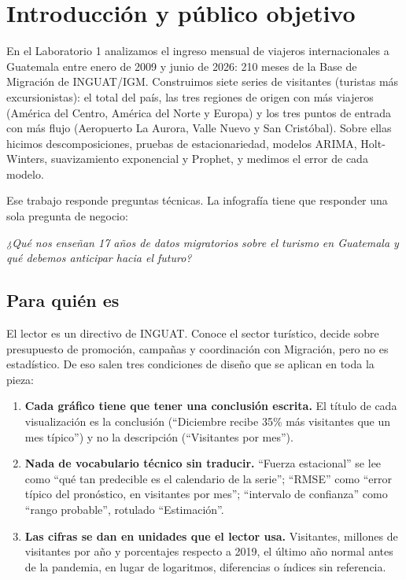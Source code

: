\section{Introducción y público objetivo}

En el Laboratorio 1 analizamos el ingreso mensual de viajeros internacionales a
Guatemala entre enero de 2009 y junio de 2026: 210 meses de la Base de Migración
de INGUAT/IGM. Construimos siete series de visitantes (turistas más
excursionistas): el total del país, las tres regiones de origen con más viajeros
(América del Centro, América del Norte y Europa) y los tres puntos de entrada con
más flujo (Aeropuerto La Aurora, Valle Nuevo y San Cristóbal). Sobre ellas hicimos
descomposiciones, pruebas de estacionariedad, modelos ARIMA, Holt-Winters,
suavizamiento exponencial y Prophet, y medimos el error de cada modelo.

Ese trabajo responde preguntas técnicas. La infografía tiene que responder una
sola pregunta de negocio:

\begin{center}
\itshape ¿Qué nos enseñan 17 años de datos migratorios sobre el turismo en
Guatemala y qué debemos anticipar hacia el futuro?
\end{center}

\subsection{Para quién es}

El lector es un directivo de INGUAT. Conoce el sector turístico, decide sobre
presupuesto de promoción, campañas y coordinación con Migración, pero no es
estadístico. De eso salen tres condiciones de diseño que se aplican en toda la
pieza:

\begin{enumerate}[leftmargin=*]
  \item \textbf{Cada gráfico tiene que tener una conclusión escrita.} El título de
  cada visualización es la conclusión (``Diciembre recibe 35\% más visitantes que
  un mes típico'') y no la descripción (``Visitantes por mes'').
  \item \textbf{Nada de vocabulario técnico sin traducir.} ``Fuerza estacional''
  se lee como ``qué tan predecible es el calendario de la serie''; ``RMSE'' como
  ``error típico del pronóstico, en visitantes por mes''; ``intervalo de
  confianza'' como ``rango probable'', rotulado ``Estimación''.
  \item \textbf{Las cifras se dan en unidades que el lector usa.} Visitantes,
  millones de visitantes por año y porcentajes respecto a 2019, el último año
  normal antes de la pandemia, en lugar de logaritmos, diferencias o índices sin
  referencia.
\end{enumerate}

